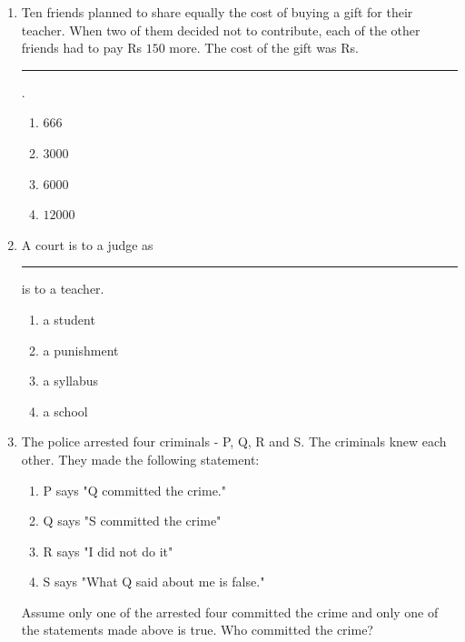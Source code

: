 \documentclass[journal,12pt,onecolumn]{IEEEtran}
\theoremstyle{remark}
\begin{document}
\begin{enumerate}
    \item Ten friends planned to share equally the cost of buying a gift for their teacher. When two of them decided not to contribute, each of the other friends had to pay Rs $150$ more. The cost of the gift was Rs. \rule{1cm}{0.1mm}.
    
    \hfill{}
\begin{multicols}{4}
    \begin{enumerate}
        \item $666$
        \item $3000$
        \item $6000$
        \item $12000$
    \end{enumerate}
\end{multicols}

    \item A court is to a judge as \rule{1.5cm}{0.1mm} is to a teacher.
    
    \hfill{}
\begin{multicols}{4}
    \begin{enumerate}
        \item a student
        \item a punishment
        \item a syllabus
        \item a school
    \end{enumerate}
\end{multicols}

    \item The police arrested four criminals - P, Q, R and S. The criminals knew each other. They made the following statement:
    
\begin{enumerate}[label = ]
\item P says "Q committed the crime."

\item Q says "S committed the crime"

\item R says "I did not do it"

\item S says "What Q said about me is false."
\end{enumerate}

Assume only one of the arrested four committed the crime and only one of the statements made above is true. Who committed the crime?


\end{enumerate}
\end{document}
